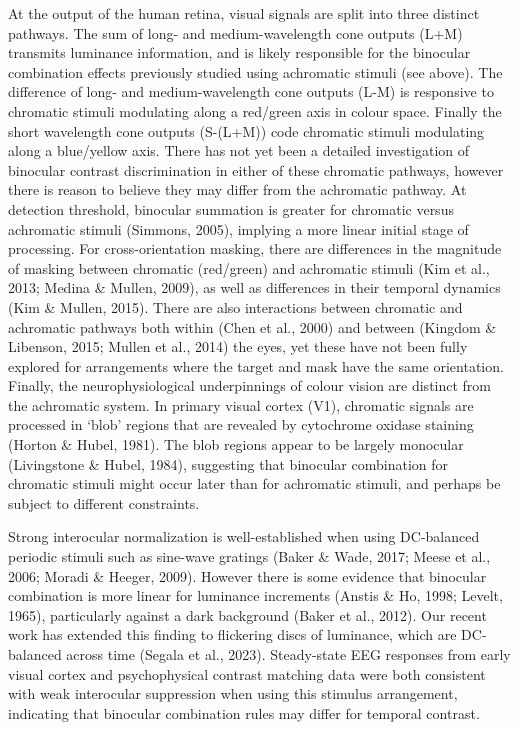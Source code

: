 \documentclass[
]{article}
\begin{document}
At the output of the human retina, visual signals are split into three distinct pathways. The sum of long- and medium-wavelength cone outputs (L+M) transmits luminance information, and is likely responsible for the binocular combination effects previously studied using achromatic stimuli (see above). The difference of long- and medium-wavelength cone outputs (L-M) is responsive to chromatic stimuli modulating along a red/green axis in colour space. Finally the short wavelength cone outputs (S-(L+M)) code chromatic stimuli modulating along a blue/yellow axis. There has not yet been a detailed investigation of binocular contrast discrimination in either of these chromatic pathways, however there is reason to believe they may differ from the achromatic pathway. At detection threshold, binocular summation is greater for chromatic versus achromatic stimuli (Simmons, 2005), implying a more linear initial stage of processing. For cross-orientation masking, there are differences in the magnitude of masking between chromatic (red/green) and achromatic stimuli (Kim et al., 2013; Medina \& Mullen, 2009), as well as differences in their temporal dynamics (Kim \& Mullen, 2015). There are also interactions between chromatic and achromatic pathways both within (Chen et al., 2000) and between (Kingdom \& Libenson, 2015; Mullen et al., 2014) the eyes, yet these have not been fully explored for arrangements where the target and mask have the same orientation. Finally, the neurophysiological underpinnings of colour vision are distinct from the achromatic system. In primary visual cortex (V1), chromatic signals are processed in `blob' regions that are revealed by cytochrome oxidase staining (Horton \& Hubel, 1981). The blob regions appear to be largely monocular (Livingstone \& Hubel, 1984), suggesting that binocular combination for chromatic stimuli might occur later than for achromatic stimuli, and perhaps be subject to different constraints.

Strong interocular normalization is well-established when using DC-balanced periodic stimuli such as sine-wave gratings (Baker \& Wade, 2017; Meese et al., 2006; Moradi \& Heeger, 2009). However there is some evidence that binocular combination is more linear for luminance increments (Anstis \& Ho, 1998; Levelt, 1965), particularly against a dark background (Baker et al., 2012). Our recent work has extended this finding to flickering discs of luminance, which are DC-balanced across time (Segala et al., 2023). Steady-state EEG responses from early visual cortex and psychophysical contrast matching data were both consistent with weak interocular suppression when using this stimulus arrangement, indicating that binocular combination rules may differ for temporal contrast.
\end{document}
